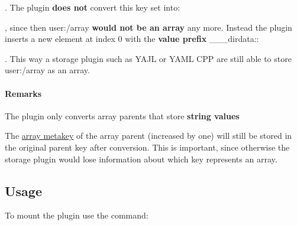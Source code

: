 

. The plugin {\bfseries does not} convert this key set into\+:




, since then {\ttfamily user\+:/array} {\bfseries would not be an array} any more. Instead the plugin inserts a new element at index 0 with the {\bfseries value prefix} {\ttfamily \+\_\+\+\_\+\+\_\+dirdata\+:}\+:




. This way a storage plugin such as Y\+A\+JL or Y\+A\+ML C\+PP are still able to store {\ttfamily user\+:/array} as an array.\hypertarget{autotoc_md170_autotoc_md173}{}\paragraph{Remarks}\label{autotoc_md170_autotoc_md173}

\begin{DoxyItemize}
\item The plugin only converts array parents that store {\bfseries string values}
\item The \hyperlink{doc_decisions_array_md}{array metakey} of the array parent (increased by one) will still be stored in the original parent key after conversion. This is important, since otherwise the storage plugin would lose information about which key represents an array.
\end{DoxyItemize}\hypertarget{autotoc_md170_autotoc_md174}{}\subsection{Usage}\label{autotoc_md170_autotoc_md174}
To mount the plugin use the command\+:

